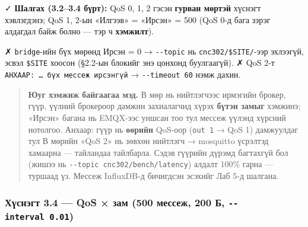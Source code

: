 \begin{Shaded}
\begin{Highlighting}[]
 \KeywordTok{\textbackslash{}}
     \KeywordTok{\textbackslash{}}
     \StringTok{/}\StringTok{/}\StringTok{/} \KeywordTok{\textbackslash{}}
\end{Highlighting}
\end{Shaded}

✓ \textbf{Шалгах (3.2--3.4 бүрт):} QoS 0, 1, 2 гэсэн \textbf{гурван мөртэй} хүснэгт хэвлэгдэнэ; QoS 1, 2-ын «Илгээв» = «Ирсэн» = 500 (QoS 0-д бага зэрэг алдагдал байж болно --- тэр ч \textbf{хэмжилт}).

✗ \texttt{bridge}-ийн бүх мөрөнд Ирсэн = 0 → \texttt{-\/-topic} нь \texttt{cnc302/\$SITE/}-ээр эхлээгүй, эсвэл \texttt{\$SITE} хоосон (§2.2-ын блокийг энэ цонхонд буулгаагүй). ✗ QoS 2-т \texttt{АНХААР:\allowbreak{}\ \ldots{}\ бүх\ мессеж\ ирсэнгүй} → \texttt{-\/-timeout\ 60} нэмж дахин.

\begin{quote}
\textbf{Юуг хэмжиж байгаагаа мэд.} В мөр нь нийтлэгчээс ирмэгийн брокер, гүүр, үүлний брокероор дамжин захиалагчид хүрэх \textbf{бүтэн замыг} хэмжинэ; «Ирсэн» багана нь EMQX-ээс уншсан тоо тул мессеж үүлэнд хүрсний нотолгоо. Анхаар: гүүр нь \textbf{өөрийн} QoS-оор (\texttt{out\ 1} → QoS 1) дамжуулдаг тул В мөрийн «QoS 2» нь зөвхөн нийтлэгч → mosquitto үсрэлтэд хамаарна --- тайландаа тайлбарла. Сэдэв гүүрийн дүрэмд багтахгүй бол (жишээ нь \texttt{-\/\allowbreak{}-topic\ cnc302/\allowbreak{}bench/\allowbreak{}latency}) алдалт 100\% гарна --- туршаад үз. Мессеж InfluxDB-д бичигдсэн эсэхийг Лаб 5-д шалгана.
\end{quote}

\hypertarget{ux445ux4afux441ux43dux44dux433ux442-3.4-qos-ux437ux430ux43c-500-ux43cux435ux441ux441ux435ux436-200-ux431---interval-0.01}{%
\subsubsection{\texorpdfstring{Хүснэгт 3.4 --- QoS × зам (500 мессеж, 200 Б, \texttt{-\/\allowbreak{}-interval\ 0.\allowbreak{}01})}{Хүснэгт 3.4 --- QoS × зам (500 мессеж, 200 Б, -\/-interval 0.01)}}\label{ux445ux4afux441ux43dux44dux433ux442-3.4-qos-ux437ux430ux43c-500-ux43cux435ux441ux441ux435ux436-200-ux431---interval-0.01}}

